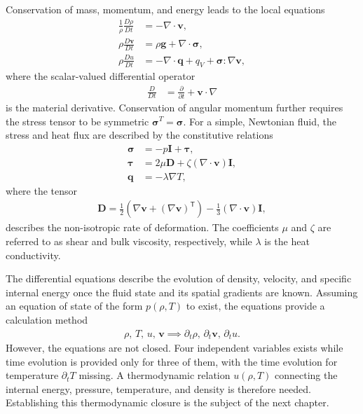 Conservation of mass, momentum, and energy leads to the local equations
\begin{align}
    \label{eq:density-collection}
    \frac{1}{\rho}\frac{D\rho}{Dt}&= -\nabla\cdot\bm{v},\\
    \label{eq:momentum-collection}
    \rho\frac{D\bm{v}}{Dt}&= \rho\bm{g}+\nabla\cdot\bm{\sigma},\\
    \label{eq:internal-energy-collection}
    \rho\frac{Du}{Dt}&= -\nabla\cdot\bm{q}+q_V+\bm{\sigma}:\nabla\bm{v},
\end{align}
where the scalar-valued differential operator
\begin{align}
    \frac{D}{Dt}
    &= \frac{\partial}{\partial t}+\bm{v}\cdot\nabla
\end{align}
is the material derivative. Conservation of angular momentum further requires the stress tensor to be symmetric $\bm{\sigma}^T=\bm{\sigma}$. For a simple, Newtonian fluid, the stress and heat flux are described by the constitutive relations
\begin{align}
    \label{eq:sigma-collection}
    \bm{\sigma}&=-p\bm{I}+\bm{\tau},\\
    \label{eq:tau-collection}
    \bm{\tau}&=2\mu\bm{D}+\zeta(\nabla\cdot\bm{v})\bm{I},\\
    \label{eq:heat-flux-collection}
    \bm{q}&=-\lambda\nabla T,
\end{align}
where the tensor
\begin{align}
    \label{eq:D-tensor-collection}
    \bm{D}=\frac{1}{2}\left(\nabla\bm{v}+(\nabla\bm{v})^{\mathsf T}\right)-\frac{1}{3}(\nabla\cdot\bm{v})\bm{I},
\end{align}
describes the non-isotropic rate of deformation. The coefficients $\mu$ and $\zeta$ are referred to as shear and bulk viscosity, respectively, while $\lambda$ is the heat conductivity.

The differential equations describe the evolution of density, velocity, and specific internal energy once the fluid state and its spatial gradients are known. Assuming an equation of state of the form $p(\rho,T)$ to exist, the equations provide a calculation method
\begin{align}
    \rho,\, T,\, u,\, \bm{v} \implies \partial_t\rho,\, \partial_t\bm{v},\, \partial_tu.
\end{align}
However, the equations are not closed. Four independent variables exists while time evolution is provided only for three of them, with the time evolution for temperature $\partial_tT$ missing. A thermodynamic relation $u(\rho,T)$ connecting the internal energy, pressure, temperature, and density is therefore needed. Establishing this thermodynamic closure is the subject of the next chapter.

